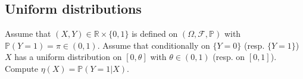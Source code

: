 \documentclass[a4paper,10pt,fleqn]{article}
\newcommand{\eqsp}{\,}
\newcommand{\rmd}{\mathrm{d}}
\newcommand{\bP}{\mathbb{P}}
\newcommand{\1}{\ensuremath{\mathbbm{1}}}
\begin{document}
\subsection{Uniform distributions}
Assume that $(X,Y)\in\mathbb{R}\times\{0,1\}$ is defined on $(\Omega,\mathcal{F},\mathbb{P})$ with $\mathbb{P}(Y=1) = \pi \in(0,1)$.  Assume that conditionally on $\{Y=0\}$ (resp. $\{Y=1\}$) $X$ has a uniform distribution on $[0,\theta]$ with $\theta\in(0,1)$ (resp. on $[0,1]$). Compute $\eta(X) = \mathbb{P}(Y=1 |X)$.
%
%
%

\end{document}
